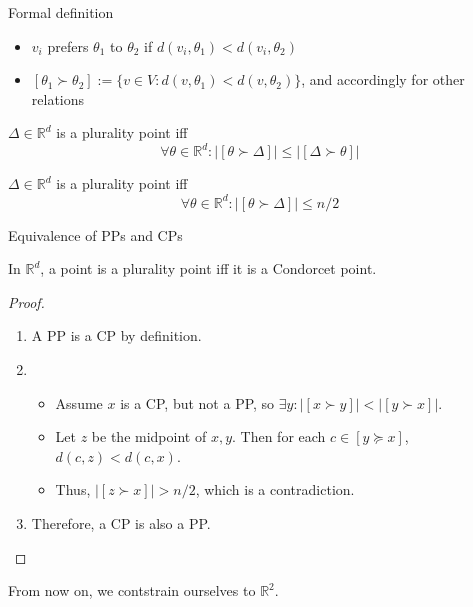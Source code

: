 \documentclass{beamer}
\newcommand{\RR}{\mathbb{R}}
\newcommand{\preferers}[3][\succ]{[#2 #1 #3]}
\newcommand{\npreferers}[3][\succ]{\lvert\preferers[#1]{#2}{#3}\rvert}
\newcommand{\eqspacing}[2]{%
  \setlength\abovedisplayskip{#1}%
  \setlength\belowdisplayskip{#2}%
}
\begin{document}
\begin{frame}{Formal definition}
  \begin{definition}[Preference]
    \begin{itemize}
    \item \(v_i\) prefers \(\theta_1\) to \(\theta_2\) if \(d(v_i, \theta_1) < d(v_i, \theta_2)\)
    \item \(\preferers{\theta_1}{\theta_2}  := \{v \in V : d(v, \theta_1) < d(v, \theta_2)\}\), and
      accordingly for other relations
    \end{itemize}
  \end{definition}
  \begin{definition}
    \eqspacing{0pt}{0pt}
    \(\Delta \in \RR^d\) is a plurality point iff
    \begin{equation*}
      \forall \theta \in \RR^d : \npreferers{\theta}{\Delta} \leq \npreferers{\Delta}{\theta}
    \end{equation*}
  \end{definition}
  \begin{definition}
    \eqspacing{0pt}{0pt}
    \(\Delta \in \RR^d\) is a plurality point iff
    \begin{equation*}
      \forall \theta \in \RR^d : \npreferers{\theta}{\Delta} \leq n/2
    \end{equation*}
  \end{definition}
\end{frame}


\begin{frame}{Equivalence of PPs and CPs}
  \begin{lemma}[Equivalence]  %
    In \(\RR^d\), a point is a plurality point iff it is a Condorcet point.
  \end{lemma}
  \begin{proof}
    \begin{enumerate}
    \item A PP is a CP by definition.
    \item
      \begin{itemize}
      \item Assume \(x\) is a CP, but not a PP, so
        \(\exists y: \npreferers{x}{y} < \npreferers{y}{x}\).
      \item Let \(z\) be the midpoint of \(x, y\).  Then for each
        \(c \in \preferers[\succeq]{y}{x}\), \(d(c, z) < d(c, x)\).
      \item Thus, \(\npreferers{z}{x} > n/2\), which is a contradiction.
      \end{itemize}
    \item Therefore, a CP is also a PP.
    \end{enumerate}
  \end{proof}

  From now on, we contstrain ourselves to \(\RR^2\).  
\end{frame}
\end{document}
